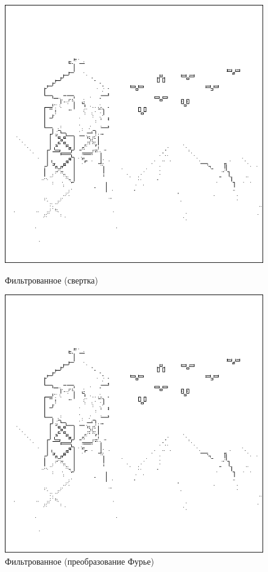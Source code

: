 \documentclass[a4paper]{article}
\begin{document}
\begin{figure}[H]
    \begin{minipage}{0.49\textwidth}
        \centering \includegraphics[width=\textwidth]{2/img_sharpen_by_conv2.png}
        \caption{Фильтрованное (свертка)}
    \end{minipage}
    \begin{minipage}{0.49\textwidth}
        \centering \includegraphics[width=\textwidth]{2/img_sharpen_by_fourier.png}
        \caption{Фильтрованное (преобразование Фурье)}
    \end{minipage}
\end{figure}\noindent\
\end{document}
